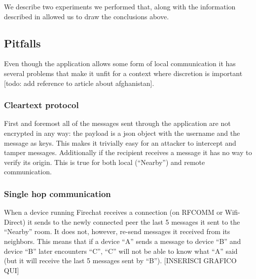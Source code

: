 We describe two experiments we performed that, along with the information described in \cite{firechat-analysis-1} \cite{firechat-analysis-2} allowed us to draw the conclusions above.

\subsection{Pitfalls}
Even though the application allows some form of local communication it has several problems that make it unfit for a context where discretion is important [todo: add reference to article about afghanistan].

\subsubsection{Cleartext protocol}
First and foremost all of the messages sent through the application are not encrypted in any way: the payload is a json \cite{json} object with the username and the message as keys.
This makes it trivially easy for an attacker to intercept and tamper messages.
Additionally if the recipient receives a message it has no way to verify its origin. This is true for both local (``Nearby'') and remote communication.

\subsubsection{Single hop communication}
When a device running Firechat receives a connection (on RFCOMM or Wifi-Direct) it sends to the newly connected peer the last 5 messages it sent to the ``Nearby'' room. It does not, however, re-send messages it received from its neighbors. This means that if a device ``A'' sends a message to device ``B'' and device ``B'' later encounters ``C'', ``C'' will not be able to know what ``A'' said (but it will receive the last 5 messages sent by ``B'').
[INSERISCI GRAFICO QUI]


